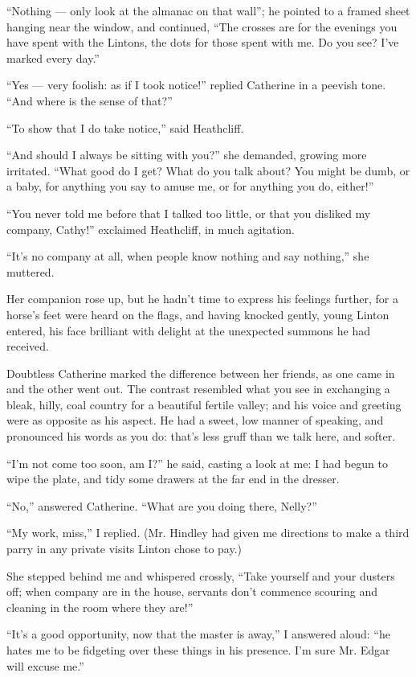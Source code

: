\par “Nothing — only look at the almanac on that wall”; he pointed to a framed sheet hanging near the window, and continued, “The crosses are for the evenings you have spent with the Lintons, the dots for those spent with me. Do you see? I've marked every day.”
\par “Yes — very foolish: as if I took notice!” replied Catherine in a peevish tone. “And where is the sense of that?”
\par “To show that I do take notice,” said Heathcliff.
\par “And should I always be sitting with you?” she demanded, growing more irritated. “What good do I get? What do you talk about? You might be dumb, or a baby, for anything you say to amuse me, or for anything you do, either!”
\par “You never told me before that I talked too little, or that you disliked my company, Cathy!” exclaimed Heathcliff, in much agitation.
\par “It's no company at all, when people know nothing and say nothing,” she muttered.
\par Her companion rose up, but he hadn't time to express his feelings further, for a horse's feet were heard on the flags, and having knocked gently, young Linton entered, his face brilliant with delight at the unexpected summons he had received.
\par Doubtless Catherine marked the difference between her friends, as one came in and the other went out. The contrast resembled what you see in exchanging a bleak, hilly, coal country for a beautiful fertile valley; and his voice and greeting were as opposite as his aspect. He had a sweet, low manner of speaking, and pronounced his words as you do: that's less gruff than we talk here, and softer.
\par “I'm not come too soon, am I?” he said, casting a look at me: I had begun to wipe the plate, and tidy some drawers at the far end in the dresser.
\par “No,” answered Catherine. “What are you doing there, Nelly?”
\par “My work, miss,” I replied. (Mr. Hindley had given me directions to make a third parry in any private visits Linton chose to pay.)
\par She stepped behind me and whispered crossly, “Take yourself and your dusters off; when company are in the house, servants don't commence scouring and cleaning in the room where they are!”
\par “It's a good opportunity, now that the master is away,” I answered aloud: “he hates me to be fidgeting over these things in his presence. I'm sure Mr. Edgar will excuse me.”
